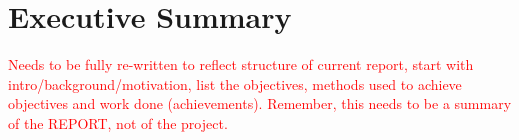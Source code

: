 \documentclass[main.tex]{subfiles}
\begin{document}

{}	%
\chapter*{Executive Summary}

\textcolor{red}{Needs to be fully re-written to reflect structure of current report, start with intro/background/motivation, list the objectives, methods used to achieve objectives and work done (achievements). Remember, this needs to be a summary of the REPORT, not of the project.}\\
\end{document}
